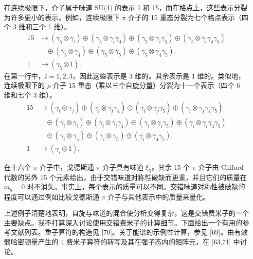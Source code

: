 在连续极限下，介子属于味道 SU(4) 的表示 1 和 15，而在格点上，这些表示分裂为许多更小的表示。例如，连续极限下 $\pi$ 介子的 15 重态分裂为七个格点表示（四个 3 维和三个 1 维）。
\begin{equation}
\begin{aligned}
15 &\to (\gamma_5\otimes\gamma_i) \oplus (\gamma_5\otimes\gamma_i\gamma_4)
\oplus (\gamma_5\otimes\gamma_i\gamma_5) \oplus (\gamma_5\otimes\gamma_i\gamma_4\gamma_5) \\
&\quad\oplus (\gamma_5\otimes\gamma_4) \oplus (\gamma_5\otimes\gamma_5) \oplus (\gamma_5\otimes\gamma_4\gamma_5), \\
1 &\to (\gamma_5\otimes 1) .
\end{aligned}
\label{eq:sf-pion-reps}
\end{equation}
在第一行中，$i = 1, 2, 3$，因此这些表示是 3 维的。其余表示是 1 维的。类似地，连续极限下的 $\rho$ 介子 15 重态（乘以三个自旋分量）分裂为十一个表示（四个 6 维和七个 3 维）。
\begin{equation}
\begin{aligned}
15 &\to (\gamma_i\otimes\gamma_j) \oplus (\gamma_i\otimes\gamma_j\gamma_4)
\oplus (\gamma_i\otimes\gamma_j\gamma_5) \oplus (\gamma_i\otimes\gamma_j\gamma_4\gamma_5) \\
&\quad\oplus (\gamma_i\otimes\gamma_i) \oplus (\gamma_i\otimes\gamma_i\gamma_4)
\oplus (\gamma_i\otimes\gamma_i\gamma_5) \oplus (\gamma_i\otimes\gamma_i\gamma_4\gamma_5) \\
&\quad\oplus (\gamma_i\otimes\gamma_4) \oplus (\gamma_i\otimes\gamma_5) \oplus (\gamma_i\otimes\gamma_4\gamma_5), \\
1 &\to (\gamma_i\otimes 1) .
\end{aligned}
\label{eq:sf-rho-reps}
\end{equation}

在十六个 $\pi$ 介子中，戈德斯通 $\pi$ 介子具有味道 $\xi_5$。其余 15 个 $\pi$ 介子由 Clifford 代数的另外 15 个元素给出，由于交错味道对称性破缺而更重，并且它们的质量在 $m_q = 0$ 时不消失。事实上，每个表示的质量可以不同。交错味道对称性被破缺的程度可以通过例如比较戈德斯通 $\pi$ 介子与其他表示中的质量来量化。

上述例子清楚地表明，自旋与味道的混合使分析变得复杂，这是交错费米子的一个主要缺点。我不打算深入讨论使用交错费米子的计算细节。下面给出一个有用的参考文献列表。重子算符的构造见 [70]。关于能谱的示例性计算，参见 [69]。由有效弱哈密顿量产生的 4 费米子算符的转写及其在强子态内的矩阵元，在 [63,71] 中讨论。

